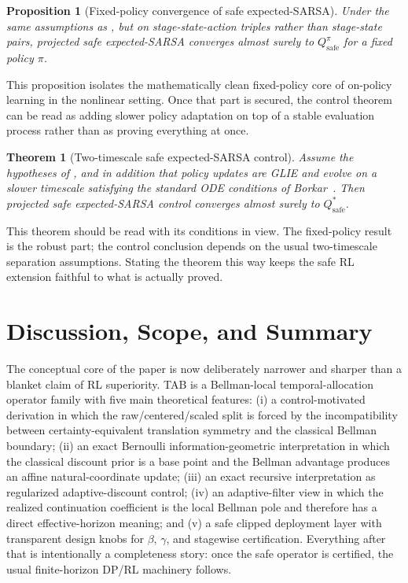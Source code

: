 \documentclass{article}
\newtheorem{theorem}{Theorem}[section]
\newtheorem{proposition}[proposition]{Proposition}
\theoremstyle{remark}
\newcommand{\safe}{\mathrm{safe}}
\begin{document}
\begin{proposition}[Fixed-policy convergence of safe expected-SARSA]
\label{prop:expected-sarsa-eval}
Under the same assumptions as , but on stage-state-action triples rather than stage-state pairs, projected safe expected-SARSA converges almost surely to $Q_\safe^{\pi}$ for a fixed policy $\pi$.
\end{proposition}

This proposition isolates the mathematically clean fixed-policy core of on-policy learning in the nonlinear setting.
Once that part is secured, the control theorem can be read as adding slower policy adaptation on top of a stable evaluation process rather than as proving everything at once.


\begin{theorem}[Two-timescale safe expected-SARSA control]
\label{thm:sarsa-convergence}
Assume the hypotheses of , and in addition that policy updates are GLIE and evolve on a slower timescale satisfying the standard ODE conditions of Borkar~\cite{borkar2000ode}.
Then projected safe expected-SARSA control converges almost surely to $Q_\safe^*$.
\end{theorem}

This theorem should be read with its conditions in view.
The fixed-policy result is the robust part; the control conclusion depends on the usual two-timescale separation assumptions.
Stating the theorem this way keeps the safe RL extension faithful to what is actually proved.


\clearpage
\section{Discussion, Scope, and Summary}
\label{sec:summary}

The conceptual core of the paper is now deliberately narrower and sharper than a blanket claim of RL superiority. TAB is a Bellman-local temporal-allocation operator family with five main theoretical features: (i) a control-motivated derivation in which the raw/centered/scaled split is forced by the incompatibility between certainty-equivalent translation symmetry and the classical Bellman boundary; (ii) an exact Bernoulli information-geometric interpretation in which the classical discount prior is a base point and the Bellman advantage produces an affine natural-coordinate update; (iii) an exact recursive interpretation as regularized adaptive-discount control; (iv) an adaptive-filter view in which the realized continuation coefficient is the local Bellman pole and therefore has a direct effective-horizon meaning; and (v) a safe clipped deployment layer with transparent design knobs for $\beta$, $\gamma$, and stagewise certification. Everything after that is intentionally a completeness story: once the safe operator is certified, the usual finite-horizon DP/RL machinery follows.
\end{document}
